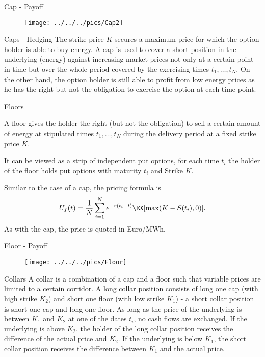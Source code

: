 {Cap - Payoff}
\begin{figure}
	\centering
		\texttt{[image: ../../../pics/Cap2]}
	\label{fig:Cap2}
\end{figure}

{Caps - Hedging}
The strike price $K$ secures a maximum price for which the option holder is able to buy energy. A cap is used to cover a short position in the underlying (energy) against
increasing market prices not only at a certain point in time but over the whole period covered by the exercising times $t_1,\ldots,t_N$.
On the other hand, the option holder is still able to profit from low energy prices as he has the right but not the obligation to exercise the option at each time point.

{Floors}






	A floor gives the holder the right (but not the
obligation) to sell a certain amount of energy at stipulated times
$t_1,\ldots,t_N$ during the delivery period at a fixed strike
price $K$.


	It can be viewed as a strip of
independent put options, for each time $t_i$ the holder of the floor holds put options with maturity $t_i$ and Strike $K$.


	
Similar to the case of a cap, the pricing formula is
$$U_f(t)=\frac{1}{N}\sum_{i=1}^Ne^{-r(t_i-t)}\EX[\max(K-S(t_i),0)].$$
As with the cap, the price is quoted in Euro/MWh.





{Floor - Payoff}
\begin{figure}
	\centering
		\texttt{[image: ../../../pics/Floor]}
	\label{fig:Floor}
\end{figure}

{Collars}
A collar is a combination of a cap and a floor such that variable prices are limited to a certain corridor. A long collar position consists of long one cap (with high strike $K_2$) and short one floor (with low strike $K_1$) - a short collar position is short one cap and long one floor. As long as the price of the underlying is between $K_1$ and $K_2$ at one of the dates $t_i$, no cash flows are exchanged. If the underlying is above $K_2$, the holder of the long collar position receives the difference of the actual price and $K_2$. If the underlying is below $K_1$, the short collar position receives the difference between $K_1$ and the actual price.

